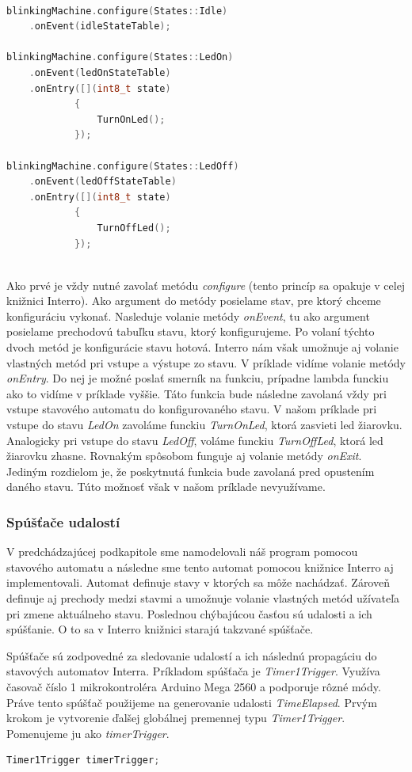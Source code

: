 \begin{lstlisting}[language=c++]  

blinkingMachine.configure(States::Idle)
    .onEvent(idleStateTable);

blinkingMachine.configure(States::LedOn)
    .onEvent(ledOnStateTable)
    .onEntry([](int8_t state)
            {
                TurnOnLed();
            });

blinkingMachine.configure(States::LedOff)
    .onEvent(ledOffStateTable)
    .onEntry([](int8_t state)
            { 
                TurnOffLed();
            });
        
    \end{lstlisting}

Ako prvé je vždy nutné zavolať metódu \textit{configure} (tento princíp sa opakuje v celej knižnici Interro).
Ako argument do metódy posielame stav, pre ktorý chceme konfiguráciu vykonať. Nasleduje volanie metódy \textit{onEvent}, tu ako argument posielame prechodovú tabuľku
stavu, ktorý konfigurujeme. Po volaní týchto dvoch metód je konfigurácie stavu hotová. Interro nám však umožnuje aj volanie vlastných metód pri vstupe a
výstupe zo stavu. V príklade vidíme volanie metódy  \textit{onEntry}. Do nej je možné poslať smerník na funkciu, prípadne lambda funckiu ako to vidíme
v príklade vyššie. Táto funkcia bude následne zavolaná vždy pri vstupe stavového automatu do konfigurovaného stavu. V našom príklade pri vstupe do stavu
\textit{LedOn} zavoláme funckiu \textit{TurnOnLed}, ktorá zasvieti led žiarovku. Analogicky pri vstupe do stavu \textit{LedOff}, voláme funckiu \textit{TurnOffLed},
ktorá led žiarovku zhasne. Rovnakým spôsobom funguje aj volanie metódy
\textit{onExit}. Jediným rozdielom je, že poskytnutá funkcia bude zavolaná pred opustením daného stavu. Túto možnosť však v našom príklade nevyužívame.

\subsubsection{Spúšťače udalostí}
V predchádzajúcej podkapitole sme namodelovali náš program pomocou stavového automatu a následne sme tento automat pomocou knižnice Interro aj implementovali.
Automat definuje stavy v ktorých sa môže nachádzať. Zároveň definuje aj prechody medzi stavmi a umožnuje volanie vlastných metód užívateľa pri zmene aktuálneho stavu.
Poslednou chýbajúcou časťou sú udalosti a ich spúšťanie. O to sa v Interro knižnici starajú takzvané spúšťače. \par
Spúšťače sú zodpovedné za sledovanie udalostí a ich následnú propagáciu do stavových automatov Interra.
Príkladom spúšťača je \textit{Timer1Trigger}. Využíva časovač číslo 1 mikrokontroléra Arduino Mega 2560 a podporuje rôzné módy.
Práve tento spúšťač použijeme na generovanie udalosti \textit{TimeElapsed}. Prvým krokom je vytvorenie ďalšej globálnej premennej typu \textit{Timer1Trigger}.
Pomenujeme ju ako \textit{timerTrigger}.
\begin{lstlisting}[language=c++]  
Timer1Trigger timerTrigger;            
\end{lstlisting}

